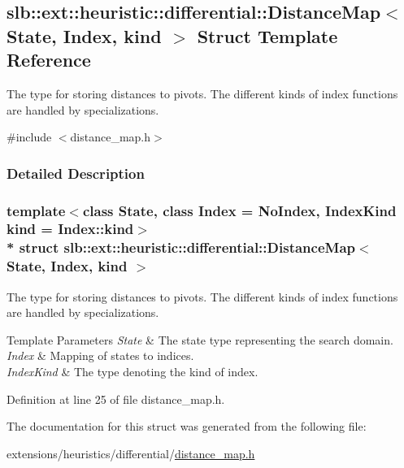 \hypertarget{structslb_1_1ext_1_1heuristic_1_1differential_1_1DistanceMap}{}\subsection{slb\+:\+:ext\+:\+:heuristic\+:\+:differential\+:\+:Distance\+Map$<$ State, Index, kind $>$ Struct Template Reference}
\label{structslb_1_1ext_1_1heuristic_1_1differential_1_1DistanceMap}


The type for storing distances to pivots. The different kinds of index functions are handled by specializations.  




{\ttfamily \#include $<$distance\+\_\+map.\+h$>$}



\subsubsection{Detailed Description}
\subsubsection*{template$<$class State, class Index = No\+Index, Index\+Kind kind = Index\+::kind$>$\\*
struct slb\+::ext\+::heuristic\+::differential\+::\+Distance\+Map$<$ State, Index, kind $>$}

The type for storing distances to pivots. The different kinds of index functions are handled by specializations. 


\begin{DoxyTemplParams}{Template Parameters}
{\em State} & The state type representing the search domain. \\
\hline
{\em Index} & Mapping of states to indices. \\
\hline
{\em Index\+Kind} & The type denoting the kind of index. \\
\hline
\end{DoxyTemplParams}


Definition at line 25 of file distance\+\_\+map.\+h.



The documentation for this struct was generated from the following file\+:\begin{DoxyCompactItemize}
\item 
extensions/heuristics/differential/\hyperlink{distance__map_8h}{distance\+\_\+map.\+h}\end{DoxyCompactItemize}
